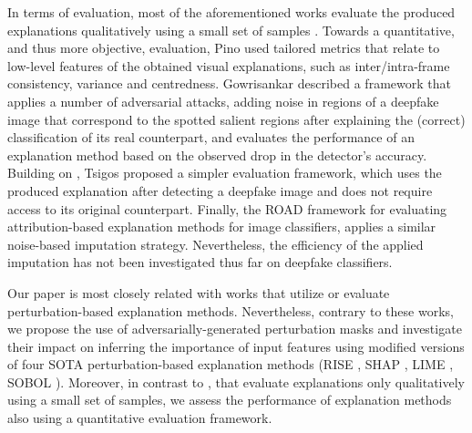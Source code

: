 In terms of evaluation, most of the aforementioned works evaluate the produced explanations qualitatively using a small set of samples \cite{9092227,9707568,SILVA2022100217,9993294,10350382,Jia_2024_CVPR}. Towards a quantitative, and thus more objective, evaluation, Pino \etal \cite{DBLP:journals/corr/abs-2105-05902} used tailored metrics that relate to low-level features of the obtained visual explanations, such as inter/intra-frame consistency, variance and centredness. Gowrisankar \etal \cite{GOWRISANKAR2024103684} described a framework that applies a number of adversarial attacks, adding noise in regions of a deepfake image that correspond to the spotted salient regions after explaining the (correct) classification of its real counterpart, and evaluates the performance of an explanation method based on the observed drop in the detector's accuracy. Building on \cite{GOWRISANKAR2024103684}, Tsigos \etal \cite{10.1145/3643491.3660292} proposed a simpler evaluation framework, which uses the produced explanation after detecting a deepfake image and does not require access to its original counterpart. Finally, the ROAD framework \cite{pmlr-v162-rong22a} for evaluating attribution-based explanation methods for image classifiers, applies a similar noise-based imputation strategy. Nevertheless, the efficiency of the applied imputation has not been investigated thus far on deepfake classifiers. 

Our paper is most closely related with works that utilize \cite{9092227,9993294} or evaluate \cite{GOWRISANKAR2024103684,10.1145/3643491.3660292} perturbation-based explanation methods. Nevertheless, contrary to these works, we propose the use of adversarially-generated perturbation masks and investigate their impact on inferring the importance of input features using modified versions of four SOTA perturbation-based explanation methods (RISE \cite{DBLP:conf/bmvc/PetsiukDS18}, SHAP \cite{10.5555/3295222.3295230}, LIME \cite{10.1145/2939672.2939778}, SOBOL \cite{fel2021sobol}). Moreover, in contrast to \cite{9092227,9707568,SILVA2022100217,9993294,10350382}, that evaluate explanations only qualitatively using a small set of samples, we assess the performance of explanation methods also using a quantitative evaluation framework.